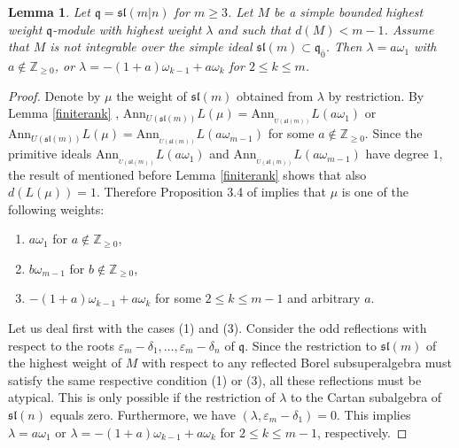 \documentclass[12pt]{amsart}
\makeatletter
\def\@putname#1#2#3#4{\def\@@ref{#3}\let\old@bf\bf
        \def\bf##1{\old@bf\if?\noexpand##1?{#4}\else##1\fi}%
	#1{#2}%
        \let\bf\old@bf}
\def\@putname#1#2#3#4{\def\@@ref{#3}\let\old@bf\bf	%
	\let\old@reset@font\reset@font			%
        \def\bf##1{\old@bf\if?\noexpand##1?{#4}\else##1\fi}%
	\def\reset@font##1##2{\old@reset@font##1\if?\noexpand##2?{#4}\else##2\fi}#1{#2}%
        \let\bf\old@bf\let\reset@font\old@reset@font}
\let\my@ref=\ref
\def\ref#1{\@putname\my@ref{#1}{#1}{\tiny\rm\@@ref}}
\let\my@cite=\cite
\def\cite#1{\@putname\my@cite{#1}{\@citeb}{\tiny\rm\@@ref}}
\theoremstyle{plain} %
\numberwithin{equation}{section}
\theoremstyle{definition}
\theoremstyle{remark}
\theoremstyle{plain} %
\newtheorem{lemma}[definition]{Lemma}
\renewcommand{\sl}{\mathfrak{sl}}
\newcommand{\Ann}{\mathrm{Ann}}
\def\gq{\mathfrak{q}}
\makeatother
\begin{document}
    \begin{lemma}\label{highestweight}  Let $\gq=\mathfrak{sl}(m|n)$ for   $m\geq 3$. Let 
      $M$ be a simple  bounded highest weight $\gq$-module with highest weight $\lambda$ and such that  $d(M)<m-1$. Assume that $M$ is not
      integrable over the simple ideal $\mathfrak{sl}(m)\subset\gq_{\bar 0}$. Then $\lambda=a\omega_1$ with $a\notin \mathbb Z_{\geq 0}$,
      or $\lambda=-(1+a)\omega_{k-1}+a\omega_k$ for  $2\leq k\leq m$.
   \end{lemma}
   \begin{proof}Denote by $\mu$ the weight of $\sl(m)$ obtained from $\lambda$ by restriction.
     By  Lemma \ref{finiterank}, $\Ann_{U(\mathfrak{sl}(m))}L(\mu)=\Ann_{_{U(\mathfrak{sl}(m))}}L(a\omega_1)$ or $\Ann_{U(\mathfrak{sl}(m))}L(\mu)= \Ann_{_{U(\mathfrak{sl}(m))}}L(a\omega_{m-1})$
     for some $a\notin\mathbb Z_{\geq 0}$. Since the primitive ideals $\Ann_{_{U(\mathfrak{sl}(m))}}L(a\omega_1)$ and  $\Ann_{_{U(\mathfrak{sl}(m))}}L(a\omega_{m-1})$ have degree $1$, the result of \cite{PSer3} mentioned before Lemma \ref{finiterank} shows that also $d (L(\mu)) = 1$. Therefore        Proposition 3.4 of \cite{BBL} implies that $\mu$ is one of the following
     weights:
     \begin{enumerate}
     \item $a\omega_1$ for $a\notin \mathbb Z_{\geq 0}$,
     \item$b\omega_{m-1}$ for  $b\notin \mathbb Z_{\geq 0}$,
       \item $-(1+a)\omega_{k-1}+a\omega_k$ for some   $2\leq k\leq m-1$ and arbitrary $a$.
       \end{enumerate}

       Let us deal first with the cases (1) and (3). Consider the odd reflections with respect to the roots $\varepsilon_m-\delta_1,\dots,\varepsilon_m-\delta_n$ of $\gq$.
       Since the restriction to $\mathfrak{sl}(m)$ of the highest weight of $M$ with respect to any reflected Borel subsuperalgebra must
       satisfy the same respective condition (1) or (3),
       all these reflections must be atypical. This is only possible if the restriction of $\lambda$ to the Cartan subalgebra of
       $\mathfrak{sl}(n)$ equals zero.
       Furthermore, we have $(\lambda,\varepsilon_m-\delta_1)=0$. This implies  $\lambda=a\omega_1$  or  $\lambda=-(1+a)\omega_{k-1}+a\omega_k$  for  $2\leq k\leq m-1$, respectively.


\end{proof}
\end{document}
